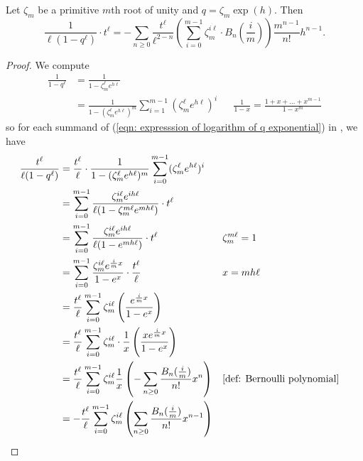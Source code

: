 \begin{lemma}\label{lem: summand expansion at roots of unity}
    Let $\zeta_{m}$ be a primitive $m$th root of unity and $q=\zeta_{m}\exp(h)$. Then 
    \begin{equation}\label{eqn: summand expansion at roots of unity}
        \frac{1}{\ell(1-q^{\ell})}\cdot t^{\ell} = -\sum_{n\geq0}\frac{t^{\ell}}{\ell^{2-n}}\left(\sum_{i=0}^{m-1}\zeta_{m}^{i\ell}\cdot B_{n}\left(\frac{i}{m}\right)\right)\frac{m^{n-1}}{n!}h^{n-1}.
    \end{equation}
\end{lemma}
\begin{proof}
    We compute 
    \begin{align*}
        \frac{1}{1-q^{\ell}} &=\frac{1}{1-\zeta_{m}^{\ell}e^{h\ell}} \\
        &= \frac{1}{1-(\zeta_{m}^{\ell}e^{h\ell})^{m}}\sum_{i=1}^{m-1}(\zeta_{m}^{\ell}e^{h\ell})^{i} && \frac{1}{1-x}=\frac{1+x+\dots+x^{m-1}}{1-x^{m}}
    \end{align*}
    so for each summand of (\ref{eqn: expresssion of logarithm of q exponential}) in , we have 
    \begin{align*}
        \frac{t^{\ell}}{\ell(1-q^{\ell})}&=\frac{t^{\ell}}{\ell}\cdot\frac{1}{1-(\zeta_{m}^{\ell}e^{h\ell})^{m}}\sum_{i=0}^{m-1}(\zeta_{m}^{\ell}e^{h\ell})^{i} \\
        &= \sum_{i=0}^{m-1}\frac{\zeta_{m}^{i\ell}e^{ih\ell}}{\ell(1-\zeta_{m}^{m\ell}e^{mh\ell})}\cdot t^{\ell} \\
        &= \sum_{i=0}^{m-1}\frac{\zeta_{m}^{i\ell}e^{ih\ell}}{\ell(1-e^{mh\ell})}\cdot t^{\ell} && \zeta_{m}^{m\ell}=1 \\
        &= \sum_{i=0}^{m-1}\frac{\zeta_{m}^{i\ell}e^{\frac{i}{m}x}}{1-e^{x}}\cdot \frac{t^{\ell}}{\ell} && x=mh\ell \\
        &= \frac{t^{\ell}}{\ell}\sum_{i=0}^{m-1}\zeta_{m}^{i\ell}\left(\frac{e^{\frac{i}{m}x}}{1-e^{x}}\right) \\
        &= \frac{t^{\ell}}{\ell}\sum_{i=0}^{m-1}\zeta_{m}^{i\ell}\cdot\frac{1}{x}\left(\frac{xe^{\frac{i}{m}x}}{1-e^{x}}\right) \\
        &= \frac{t^{\ell}}{\ell}\sum_{i=0}^{m-1}\zeta_{m}^{i\ell}\frac{1}{x}\left(-\sum_{n\geq0}\frac{B_{n}(\frac{i}{m})}{n!}x^{n}\right) && \text{\Cref{def: Bernoulli polynomial}} \\
        &= -\frac{t^{\ell}}{\ell}\sum_{i=0}^{m-1}\zeta_{m}^{i\ell}\left(\sum_{n\geq0}\frac{B_{n}(\frac{i}{m})}{n!}x^{n-1}\right) \\

\end{align*}
\end{proof}
